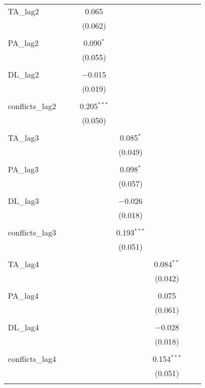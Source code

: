 \begin{table}[!htbp]
\begin{tabular}{@{\extracolsep{5pt}}lccccccc}
 TA\_lag2 &  &  & 0.065 &  &  &  &  \\ 
  &  &  & (0.062) &  &  &  &  \\ 
  & & & & & & & \\ 
 PA\_lag2 &  &  & 0.090$^{*}$ &  &  &  &  \\ 
  &  &  & (0.055) &  &  &  &  \\ 
  & & & & & & & \\ 
 DL\_lag2 &  &  & $-$0.015 &  &  &  &  \\ 
  &  &  & (0.019) &  &  &  &  \\ 
  & & & & & & & \\ 
 conflicts\_lag2 &  &  & 0.205$^{***}$ &  &  &  &  \\ 
  &  &  & (0.050) &  &  &  &  \\ 
  & & & & & & & \\ 
 TA\_lag3 &  &  &  & 0.085$^{*}$ &  &  &  \\ 
  &  &  &  & (0.049) &  &  &  \\ 
  & & & & & & & \\ 
 PA\_lag3 &  &  &  & 0.098$^{*}$ &  &  &  \\ 
  &  &  &  & (0.057) &  &  &  \\ 
  & & & & & & & \\ 
 DL\_lag3 &  &  &  & $-$0.026 &  &  &  \\ 
  &  &  &  & (0.018) &  &  &  \\ 
  & & & & & & & \\ 
 conflicts\_lag3 &  &  &  & 0.193$^{***}$ &  &  &  \\ 
  &  &  &  & (0.051) &  &  &  \\ 
  & & & & & & & \\ 
 TA\_lag4 &  &  &  &  & 0.084$^{**}$ &  &  \\ 
  &  &  &  &  & (0.042) &  &  \\ 
  & & & & & & & \\ 
 PA\_lag4 &  &  &  &  & 0.075 &  &  \\ 
  &  &  &  &  & (0.061) &  &  \\ 
  & & & & & & & \\ 
 DL\_lag4 &  &  &  &  & $-$0.028 &  &  \\ 
  &  &  &  &  & (0.018) &  &  \\ 
  & & & & & & & \\ 
 conflicts\_lag4 &  &  &  &  & 0.154$^{***}$ &  &  \\ 
  &  &  &  &  & (0.051) &  &  \\ 
  & & & & & & & \\ 

\end{tabular}
\end{table}
